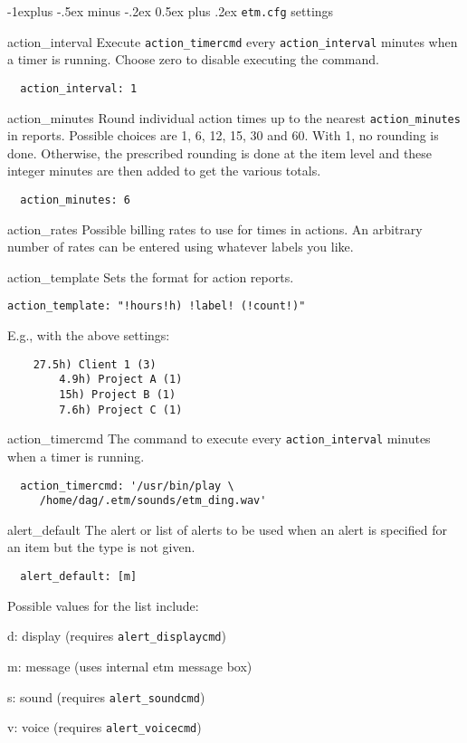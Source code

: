 \documentclass[9pt,landscape]{article}
\makeatletter
\renewcommand{\subsection}{\@startsection{subsection}{2}{0mm}%
                                {-1explus -.5ex minus -.2ex}%
                                {0.5ex plus .2ex}%
                                {\normalfont\normalsize\bfseries}}
\makeatother
\begin{document}
\begin{multicols}{3}
\subsection{\texttt{etm.cfg} settings}

\begin{compactdesc}
\item[action\_interval] Execute \verb'action_timercmd' every \verb'action_interval' minutes when a timer is running. Choose zero to disable executing the command.
\begin{verbatim}
  action_interval: 1
\end{verbatim}

\item[action\_minutes] Round individual action times up to the nearest \verb!action_minutes! in reports. Possible choices are 1, 6, 12, 15, 30 and 60. With 1, no rounding is done. Otherwise, the prescribed rounding is done at the item level and these integer minutes are then added to get the various totals.
\begin{verbatim}
  action_minutes: 6
\end{verbatim}

\item[action\_rates] Possible billing rates to use for times in actions. An arbitrary number of rates can be entered using whatever labels you like.

\item[action\_template] Sets the format for action reports.
\begin{verbatim}
action_template: "!hours!h) !label! (!count!)"
\end{verbatim}
E.g., with the above settings:
\begin{verbatim}
    27.5h) Client 1 (3)
        4.9h) Project A (1)
        15h) Project B (1)
        7.6h) Project C (1)
\end{verbatim}

\item[action\_timercmd] The command to execute every \verb'action_interval' minutes when a timer is running.
\begin{verbatim}
  action_timercmd: '/usr/bin/play \
     /home/dag/.etm/sounds/etm_ding.wav'
\end{verbatim}

\item[alert\_default] The alert or list of alerts to be used when an alert is specified for an item but the type is not given.
\begin{verbatim}
  alert_default: [m]
\end{verbatim}
Possible values for the list include:
\begin{compactdesc}
\item[d:] display (requires \verb!alert_displaycmd!)
\item[m:] message (uses internal etm message box)
\item[s:] sound (requires \verb!alert_soundcmd!)
\item[v:] voice (requires \verb!alert_voicecmd!)
\end{compactdesc}


\end{compactdesc}
\end{multicols}
\end{document}

